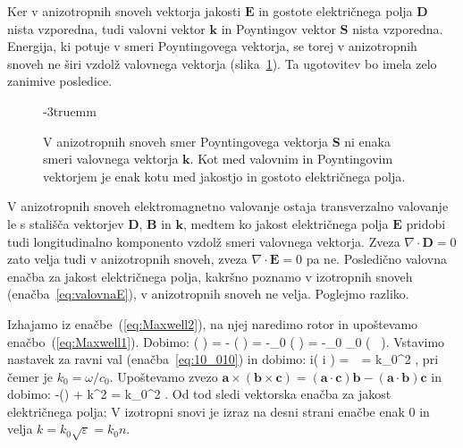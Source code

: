 Ker v anizotropnih snoveh vektorja jakosti $\mathbf{E}$ in gostote električnega 
polja $\mathbf{D}$ nista vzporedna, tudi valovni vektor $\mathbf{k}$ in Poyntingov vektor 
$\mathbf{S}$ nista vzporedna. Energija, ki potuje v smeri Poyntingovega vektorja, se
torej v anizotropnih snoveh ne širi vzdolž valovnega vektorja (slika~\ref{fig:10_koti}). 
Ta ugotovitev bo imela zelo zanimive posledice.
\begin{figure}[!h]
\centering
\def\svgwidth{40truemm} 

\caption{V anizotropnih snoveh smer Poyntingovega 
vektorja $\mathbf{S}$ ni enaka smeri valovnega vektorja $\mathbf{k}$. Kot med 
valovnim in Poyntingovim vektorjem je enak kotu med jakostjo in 
gostoto električnega polja.}
\label{fig:10_koti}
\vglue-3truemm
\end{figure}

V anizotropnih snoveh elektromagnetno valovanje ostaja transverzalno
valovanje le s stališča vektorjev $\mathbf{D}$, $\mathbf{B}$ in 
$\mathbf{k}$, medtem ko jakost električnega polja $\mathbf{E}$ pridobi 
tudi longitudinalno komponento vzdolž smeri valovnega vektorja. 
Zveza $\nabla \cdot \mathbf{D} = 0$ zato velja tudi v anizotropnih snoveh, zveza 
$\nabla \cdot \mathbf{E} = 0$ pa ne. Posledično valovna
enačba za jakost električnega polja, kakršno poznamo
v izotropnih snoveh (enačba~\ref{eq:valovnaE}), v anizotropnih snoveh ne velja. Poglejmo razliko.

Izhajamo iz enačbe~(\ref{eq:Maxwell2}), na njej naredimo rotor in upoštevamo
enačbo~(\ref{eq:Maxwell1}). Dobimo:
\beq
\nabla \times \left( \nabla \times {} \right) = -  
\left( \nabla \times {} \right) = -\mu_0  
\left( \nabla \times {} \right) = -\mu_0 \varepsilon_0 
 \left( \underline{\varepsilon}\, \right).
\label{eq:10_021}
\eeq
Vstavimo nastavek za ravni val (enačba~\ref{eq:10_010}) in dobimo:
\beq
i\times \left( i  \times {}\right) = 
\,\underline{\varepsilon}\, = 
k_0^2\,\underline{\varepsilon}\,,
\label{eq:10_022}
\eeq
pri čemer je $k_0 = \omega / c_0$. Upoštevamo zvezo $\mathbf{a}\times
\left( \mathbf{b}\times \mathbf{c}\right) = \left(\mathbf{a}\cdot 
\mathbf{c}\right) \mathbf{b} - \left(\mathbf{a}\cdot \mathbf{b}\right) \mathbf{c}$
in dobimo:
\beq
-\left(\cdot {}\right) + k^2  = 
k_0^2\,\underline{\varepsilon}\,.
\label{eq:10_024}
\eeq
Od tod sledi vektorska enačba za jakost električnega polja:
V izotropni snovi je izraz na desni strani enačbe enak 0 
in velja $k = k_0\sqrt{\varepsilon} = k_0 n$. 

